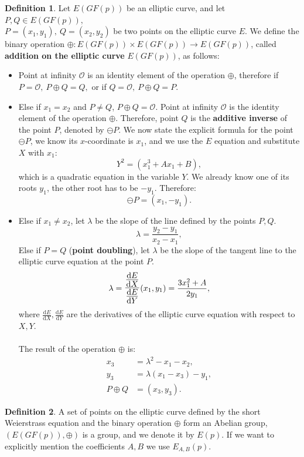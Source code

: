 \documentclass[thesis=M,english]{FITthesis}[2012/10/20]
\theoremstyle{remark}
\theoremstyle{definition}
\newtheorem{DF}{Definition}[section]
\begin{document}
\begin{DF}
Let $E(GF(p))$ be an elliptic curve, and let $P,Q \in E(GF(p)),$\\${P=(x_1,y_1),\ Q=(x_2,y_2)}$ be two points on the elliptic curve $E$. We define the binary operation $\oplus: E(GF(p)) \times E(GF(p)) \to E(GF(p))$, called \textbf{addition on the elliptic curve} $E(GF(p))$, as follows:
\begin{itemize}
\item Point at infinity $\mathcal{O}$ is an identity element of the operation $\oplus$, therefore if $P = \mathcal{O},\ P \oplus Q = Q,$ or if $Q = \mathcal{O},\ P \oplus Q = P.$
\item Else if $x_1 = x_2$ and $P\neq Q$, $P\oplus Q = \mathcal{O}.$ Point at infinity $\mathcal{O}$ is the identity element of the operation $\oplus$. Therefore, point $Q$ is the \textbf{additive inverse} of the point $P$, denoted by $\ominus P$. We now state the explicit formula for the point $\ominus P$, we know its $x$-coordinate is $x_1$, and we use the $E$ equation and substitute $X$ with $x_1$:
$$
Y^2  = (x_1^3 + Ax_1 + B),
$$
which is a quadratic equation in the variable $Y$. We already know one of its roots $y_1$, the other root has to be $-y_1$. Therefore:
$$\ominus P = (x_1, -y_1).$$
\item Else if $x_1 \neq x_2$, let $\lambda$ be the slope of the line defined by the points $P,Q.$
$$
\lambda = \frac{y_2 - y_1}{x_2 - x_1},
$$
Else if $P = Q$ (\textbf{point doubling}), let $\lambda$ be the slope of the tangent line to the elliptic curve equation at the point $P.$
$$
\lambda = \mathlarger{\mathlarger{\frac{\frac{\mathrm{d}E}{\mathrm{d}X}}{\frac{\mathrm{d}E}{\mathrm{d}Y}}}}(x_1, y_1) = \frac{3x_1^2+ A}{2y_1}, 
$$
where $\frac{\mathrm{d}E}{\mathrm{d}X}, \frac{\mathrm{d}E}{\mathrm{d}Y}$ are the derivatives of the elliptic curve equation with respect to $X,Y$. \\ \\
\noindent The result of the operation $\oplus$ is:
\begin{align*}
x_3 &= \lambda^2 - x_1 - x_2, \\
y_3 &= \lambda(x_1 - x_3) - y_1, \\ 
 P \oplus Q &= (x_3, y_3).
\end{align*}
\end{itemize}
\end{DF}
\begin{DF}
A set of points on the elliptic curve defined by the short Weierstrass equation and the binary operation $\oplus$ form an Abelian group, $(E(GF(p)), \oplus)$ is a group, and we denote it by $E(p)$. If we want to explicitly mention the coefficients $A,B$ we use $E_{A,B}(p)$.
\end{DF}
\end{document}
